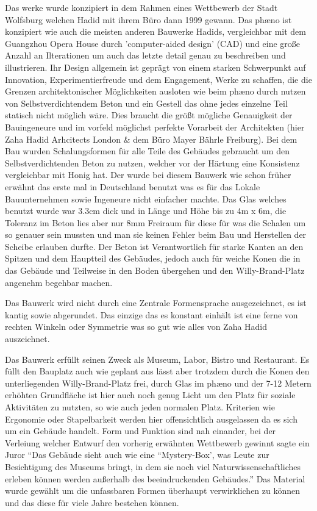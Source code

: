 \documentclass[a4paper]{article}
\begin{document}
Das werke wurde konzipiert in dem Rahmen eines Wettbewerb der Stadt Wolfsburg
welchen Hadid mit ihrem Büro dann 1999 gewann. Das phæno ist konzipiert wie auch
die meisten anderen Bauwerke Hadids, vergleichbar mit dem Guangzhou Opera House
durch 'computer-aided design' (CAD) und eine große Anzahl an Ilterationen um
auch das letzte detail genau zu beschreiben und illustrieren. Ihr Design 
allgemein ist geprägt von einem starken Schwerpunkt auf Innovation,
Experimentierfreude und dem Engagement, Werke zu schaffen, die die Grenzen
architektonischer Möglichkeiten ausloten wie beim phæno durch nutzen von
Selbstverdichtendem Beton und ein Gestell das ohne jedes einzelne Teil statisch
nicht möglich wäre. Dies braucht die größt mögliche Genauigkeit der Bauingeneure
und im vorfeld möglichst perfekte Vorarbeit der Architekten (hier Zaha Hadid
Arhcitects London \& dem Büro Mayer Bährle Freiburg).
Bei dem Bau wurden Schalungsformen für alle Teile des Gebäudes gebraucht um
den Selbstverdichtenden Beton zu nutzen, welcher vor der Härtung eine Konsistenz
vergleichbar mit Honig hat. Der wurde bei diesem Bauwerk wie schon früher
erwähnt das erste mal in Deutschland benutzt was es für das Lokale
Bauunternehmen sowie Ingeneure nicht einfacher machte. Das Glas welches benutzt
wurde war 3.3cm dick und in Länge und Höhe bis zu 4m x 6m, die Toleranz im
Beton lies aber nur 8mm Freiraum für diese für was die Schalen um so genauer
sein mussten und man sie keinen Fehler beim Bau und Herstellen der Scheibe
erlauben durfte. Der Beton ist Verantwortlich für starke Kanten an den Spitzen
und dem Hauptteil des Gebäudes, jedoch auch für weiche Konen die in das Gebäude
und Teilweise in den Boden übergehen und den Willy-Brand-Platz angenehm
begehbar machen.

Das Bauwerk wird nicht durch eine Zentrale Formensprache ausgezeichnet, es ist
kantig sowie abgerundet. Das einzige das es konstant einhält ist eine ferne von
rechten Winkeln oder Symmetrie was so gut wie alles von Zaha Hadid auszeichnet.

Das Bauwerk erfüllt seinen Zweck als Museum, Labor, Bistro und Restaurant. Es
füllt den Bauplatz auch wie geplant aus lässt aber trotzdem durch die Konen den
unterliegenden Willy-Brand-Platz frei, durch Glas im phæno und der 7-12 Metern erhöhten
Grundfläche ist hier auch noch genug Licht um den Platz für soziale Aktivitäten
zu nutzten, so wie auch jeden normalen Platz. Kriterien wie Ergonomie oder
Stapelbarkeit werden hier offensichtlich ausgelassen da es sich um ein Gebäude
handelt.
Form und Funktion sind nah einander, bei der Verleiung welcher Entwurf den
vorherig erwähnten Wettbewerb gewinnt sagte ein Juror ``Das Gebäude sieht auch wie
eine ``Mystery-Box', was Leute zur Besichtigung des Museums bringt, in dem sie
noch viel Naturwissenschaftliches erleben können werden außerhalb des
beeindruckenden Gebäudes.''
Das Material wurde gewählt um die unfassbaren Formen überhaupt verwirklichen zu
können und das diese für viele Jahre bestehen können.
\end{document}
